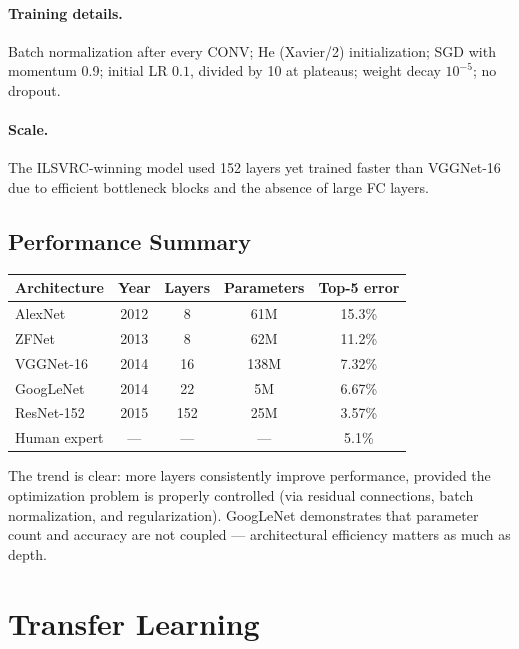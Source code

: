 \documentclass[11pt,a4paper]{article}
\theoremstyle{definition}
\theoremstyle{plain}
\theoremstyle{remark}
\begin{document}
\paragraph{Training details.} Batch normalization after every CONV; He (Xavier/2) initialization; SGD with momentum 0.9; initial LR $0.1$, divided by 10 at plateaus; weight decay $10^{-5}$; no dropout.

\paragraph{Scale.} The ILSVRC-winning model used 152 layers yet trained faster than VGGNet-16 due to efficient bottleneck blocks and the absence of large FC layers.

\subsection{Performance Summary}

\begin{center}
\renewcommand{\arraystretch}{1.3}
\begin{tabular}{lcccc}
    \hline
    \textbf{Architecture} & \textbf{Year} & \textbf{Layers} & \textbf{Parameters} & \textbf{Top-5 error} \\
    \hline
    AlexNet     & 2012 & 8   & 61M  & 15.3\% \\
    ZFNet       & 2013 & 8   & 62M  & 11.2\% \\
    VGGNet-16   & 2014 & 16  & 138M & 7.32\% \\
    GoogLeNet   & 2014 & 22  & 5M   & 6.67\% \\
    ResNet-152  & 2015 & 152 & 25M  & 3.57\% \\
    \hline
    Human expert & ---  & --- & ---  & 5.1\% \\
    \hline
\end{tabular}
\end{center}

The trend is clear: more layers consistently improve performance, provided the optimization problem is properly controlled (via residual connections, batch normalization, and regularization). GoogLeNet demonstrates that parameter count and accuracy are not coupled --- architectural efficiency matters as much as depth.


\section{Transfer Learning}
\end{document}
